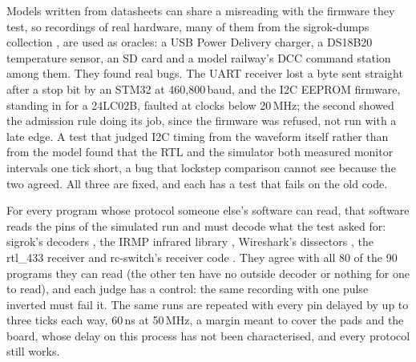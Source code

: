 \documentclass[conference,letterpaper]{IEEEtran}
\begin{document}
Models written from datasheets can share a misreading with the firmware they test, so
recordings of real hardware, many of them from the sigrok-dumps collection \cite{sigrok},
are used as oracles: a USB Power Delivery charger, a DS18B20 temperature sensor, an SD
card and a model railway's DCC command station among them. They found real bugs. The
UART receiver lost a byte sent straight after a stop bit by an STM32 at 460{,}800\,baud,
and the I2C EEPROM firmware, standing in for a 24LC02B, faulted at clocks below 20\,MHz;
the second showed the admission rule doing its job, since the firmware was refused, not
run with a late edge. A test that judged I2C timing from the waveform itself rather than
from the model found that the RTL and the simulator both measured monitor intervals one
tick short, a bug that lockstep comparison cannot see because the two agreed. All
three are fixed, and each has a test that fails on the old code.

For every program whose protocol someone else's software can read, that software reads
the pins of the simulated run and must decode what the test asked for: sigrok's decoders
\cite{sigrok}, the IRMP infrared library \cite{irmp}, Wireshark's dissectors
\cite{wireshark}, the rtl\_433 receiver \cite{rtl433} and rc-switch's receiver code
\cite{rcswitch}. They agree with all 80 of the 90 programs they can read (the other ten
have no outside decoder or nothing for one to read), and each judge has a control: the same recording with one pulse inverted must fail it. The same runs are repeated with every pin delayed by up to three
ticks each way, 60\,ns at 50\,MHz, a margin meant to cover the pads and the board, whose
delay on this process has not been characterised, and every protocol still works.
\end{document}
